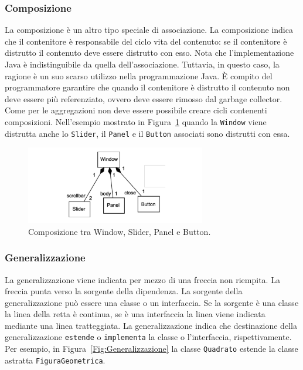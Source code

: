 \documentclass{article}
\begin{document}
\subsubsection{Composizione}
La composizione \`e un altro tipo speciale di associazione. La composizione indica che il contenitore \`e responsabile del ciclo vita del contenuto: se il contenitore \`e distrutto il contenuto deve essere distrutto con esso.
Nota che l'implementazione Java \`e indistinguibile da quella dell'associazione. Tuttavia, in questo caso, la ragione \`e un suo scarso utilizzo nella programmazione Java. \`E compito del programmatore garantire che quando il contenitore \`e distrutto il contenuto non deve essere pi\`u referenziato, ovvero deve essere rimosso dal garbage collector. Come per le aggregazioni non deve essere possibile creare cicli contenenti composizioni.
Nell'esempio mostrato in Figura~\ref{Fig:Composizione} quando la \texttt{Window} viene distrutta anche lo \texttt{Slider}, il \texttt{Panel} e il \texttt{Button} associati sono distrutti con essa.

\begin{figure}[h!]
  \centering
    \includegraphics[width=0.7\textwidth]{Img/Composizione.pdf}
      \caption{Composizione tra Window, Slider, Panel e Button.}
      \label{Fig:Composizione}
\end{figure}


\subsubsection{Generalizzazione}
La generalizzazione viene indicata per mezzo di una freccia non riempita. La freccia punta verso la sorgente della dipendenza. La sorgente della generalizzazione pu\`o essere una classe o un interfaccia. Se la sorgente \`e una classe la linea della retta \`e continua, se \`e una interfaccia la linea  viene indicata mediante una linea tratteggiata. 
La generalizzazione indica che destinazione della generalizzazione \texttt{estende} o \texttt{implementa} la classe o l'interfaccia, rispettivamente.
Per esempio, in Figura~\ref{Fig:Generalizzazione} la classe \texttt{Quadrato} estende la classe astratta  \texttt{FiguraGeometrica}.
\end{document}
